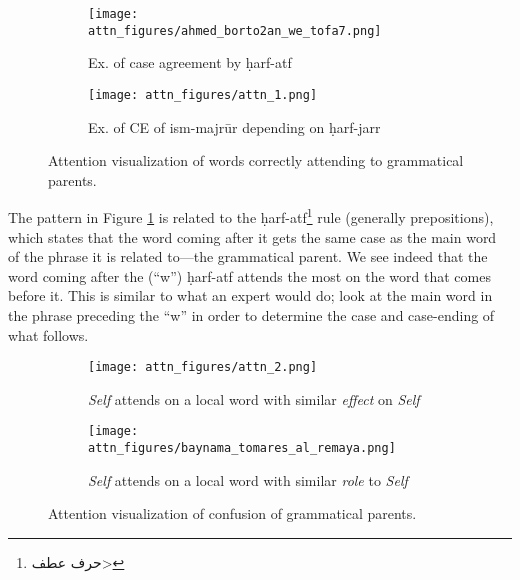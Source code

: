 \documentclass[11pt]{article}
\begin{document}
\begin{figure}[!h]
\centering
\begin{subfigure}[t]{.49\textwidth}
  \centering
  \texttt{[image: attn\_figures/ahmed\_borto2an\_we\_tofa7.png]}
  \caption{Ex. of case agreement by \d{h}arf-atf}
  \label{fig:ano_1}
\end{subfigure}\begin{subfigure}[t]{.49\textwidth}
  \centering
  \texttt{[image: attn\_figures/attn\_1.png]}
  \caption{Ex. of CE of ism-majrūr depending on \d{h}arf-jarr}
  \label{fig:ano_2}
\end{subfigure}
\caption{Attention visualization of words correctly attending to grammatical parents.}
\label{fig:attn_ano_1}
\end{figure}

The pattern in Figure \ref{fig:ano_1} is related to the \d{h}arf-atf\footnote{\<حرف عطف>} rule (generally prepositions), which states that the word coming after it gets the same case as the main word of the phrase it is related to---the grammatical parent. We see indeed that the word coming after the (``w'') \d{h}arf-atf attends the most on the word that comes before it. This is similar to what an expert would do; look at the main word in the phrase preceding the ``w'' in order to determine the case and case-ending of what follows.

\begin{figure}[h]
\centering

\begin{subfigure}[t]{.49\textwidth}
  \centering
  \texttt{[image: attn\_figures/attn\_2.png]}
  \caption{\emph{Self} attends on a local word with similar \emph{effect} on \emph{Self}}
  \label{fig:ano_3}
\end{subfigure} \begin{subfigure}[t]{.49\textwidth}
  \centering
  \texttt{[image: attn\_figures/baynama\_tomares\_al\_remaya.png]}
  \caption{\emph{Self} attends on a local word with similar \emph{role} to \emph{Self}}
  \label{fig:ano_4}
\end{subfigure}
\caption{Attention visualization of confusion of grammatical parents.}
\label{fig:attn_ano_2}
\end{figure}
\end{document}
